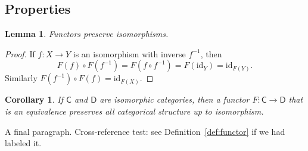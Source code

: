 \documentclass[a4paper]{article}
\newtheorem{lemma}[theorem]{Lemma}
\newtheorem{corollary}[theorem]{Corollary}
\theoremstyle{remark}
\begin{document}
\subsection{Properties}

\begin{lemma}
Functors preserve isomorphisms.
\end{lemma}

\begin{proof}
If $f \colon X \to Y$ is an isomorphism with inverse $f^{-1}$, then
\[
  F(f) \circ F(f^{-1}) = F(f \circ f^{-1}) = F(\mathrm{id}_Y)
    = \mathrm{id}_{F(Y)}.
\]
Similarly $F(f^{-1}) \circ F(f) = \mathrm{id}_{F(X)}$.
\end{proof}

\begin{corollary}
If $\mathsf{C}$ and $\mathsf{D}$ are isomorphic categories, then
a functor $F \colon \mathsf{C} \to \mathsf{D}$ that is an equivalence
preserves all categorical structure up to isomorphism.
\end{corollary}

A final paragraph.  Cross-reference test: see
Definition~\ref{def:functor} if we had labeled it.
\end{document}
